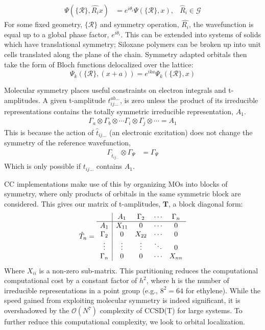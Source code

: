 \documentclass[letterpaper, 12pt]{article}
\newcommand{\matr}[1]{\bm{#1}} %
\begin{document}
\begin{align}
 \Psi(\{\mathcal{R}\}, \hat{R_i}x)&=e^{i\theta_i}\Psi(\{\mathcal{R}\},x), &\hat{R}_i \in \mathcal{G}
\end{align}
For some fixed geometry, $\{\mathcal{R}\}$ and symmetry operation, $\hat{R_i}$, the wavefunction is equal up to a global phase factor,  $e^{i\theta_i}$.
This can be extended into systems of solids which have translational symmetry; Siloxane polymers can be broken up into  unit cells translated along the plane of the  chain. Symmetry adapted orbitals then take the form of Bloch functions delocalized over the lattice:
\begin{equation}
\Psi_k(\{\mathcal{R}\},(x+a)) = e^{ika}\Psi_k(\{\mathcal{R}\},x) 
\end{equation}

Molecular symmetry places useful constraints on electron integrals and t-amplitudes. A given t-amplitude $t^{ab\dots}_{ij\dots}$, is zero unless the product of its irreducible representations contains the totally symmetric irreducible representation, $A_1$.
\begin{align}
\Gamma_a \otimes \Gamma_b \otimes \cdots \Gamma_i \otimes \Gamma_j \otimes \cdots  = A_1
\end{align}
This is because the action of $\hat{t}_{ij\dots}$ (an electronic excitation) does not change the symmetry of the reference wavefunction, 
\begin{align}
\Gamma_{\hat{t}_{ij\dots}} \otimes \Gamma_\Psi &= \Gamma_\Psi 
\end{align}
Which is only possible if $t_{ij\dots}$ contains $A_1$.

CC implementations make use of this by organizing MOs into blocks of symmetry, where only products of orbitals in the same symmetric block are considered. This gives our matrix of t-amplitudes, ${\matr{T}}$, a block diagonal form:
\begin{equation*}
\hat{T}_{n}=\begin{array}{c| c c c c c}
&A_1 & \Gamma_2 & \cdots & \Gamma_n\\
\hline
A_1 & X_{11} &0 & \cdots & 0\\
\Gamma_2  & 0 & X_{22} &\cdots&0\\
\vdots & \vdots &\vdots & \ddots & 0\\
\Gamma_n & 0&0 & \cdots & X_{nn}
\end{array}\label{eq:diag}
\end{equation*}
Where $X_{ii}$ is a non-zero sub-matrix. This partitioning reduces the computational computational cost by a constant factor of $h^2$, where h is the number of irreducible representations in a point group (e.g., $8^2=64$ for ethylene). While the speed gained from exploiting molecular symmetry is indeed significant, it is overshadowed by the $\mathcal{O}(N^7)$ complexity of CCSD(T) for large systems. To further reduce this computational complexity, we look to orbital localization. 
\end{document}
